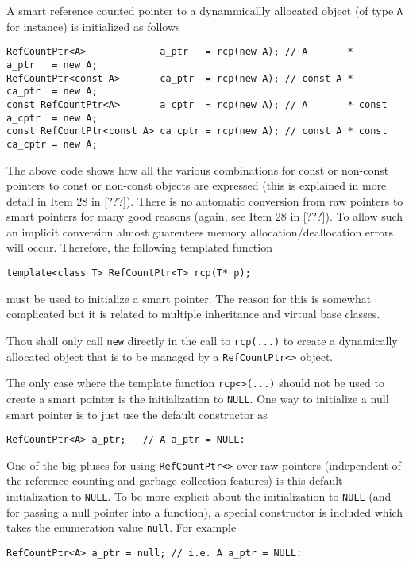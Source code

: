 A smart reference counted pointer to a dynammicallly allocated object
(of type \texttt{A} for instance) is initialized as follows
%
{\scriptsize\begin{verbatim}
RefCountPtr<A>             a_ptr   = rcp(new A); // A       *       a_ptr   = new A;
RefCountPtr<const A>       ca_ptr  = rcp(new A); // const A *       ca_ptr  = new A;
const RefCountPtr<A>       a_cptr  = rcp(new A); // A       * const a_cptr  = new A;
const RefCountPtr<const A> ca_cptr = rcp(new A); // const A * const ca_cptr = new A;
\end{verbatim}}
%
The above code shows how all the various combinations for const or
non-const pointers to const or non-const objects are expressed (this
is explained in more detail in Item 28 in [???]).  There is no
automatic conversion from raw pointers to smart pointers for many good
reasons (again, see Item 28 in [???]).  To allow such an implicit
conversion almost guarentees memory allocation/deallocation errors
will occur.  Therefore, the following templated function
%
{\scriptsize\begin{verbatim}
template<class T> RefCountPtr<T> rcp(T* p);
\end{verbatim}}
%
\noindent{}must be used to initialize a smart pointer.
The reason for this is somewhat complicated but it is related to
multiple inheritance and virtual base classes.

\begin{commandment}\label{rcp:cmd:rcp-new}
Thou shall only call \texttt{new} directly
in the call to \texttt{rcp(...)} to create a dynamically allocated
object that is to be managed by a \texttt{RefCountPtr<>} object.
\end{commandment}

The only case where the template function \texttt{rcp<>(...)} should
not be used to create a smart pointer is the initialization to
\texttt{NULL}.  One way to initialize a null smart pointer is to just
use the default constructor as
%
{\scriptsize\begin{verbatim}
RefCountPtr<A> a_ptr;   // A a_ptr = NULL:
\end{verbatim}}
%
One of the big pluses for using \texttt{RefCountPtr<>} over raw
pointers (independent of the reference counting and garbage collection
features) is this default initialization to \texttt{NULL}.
To be more explicit about the initialization to \texttt{NULL} (and for
passing a null pointer into a function), a special constructor is
included which takes the enumeration value \texttt{null}.  For example
%
{\scriptsize\begin{verbatim}
RefCountPtr<A> a_ptr = null; // i.e. A a_ptr = NULL:
\end{verbatim}}
%

